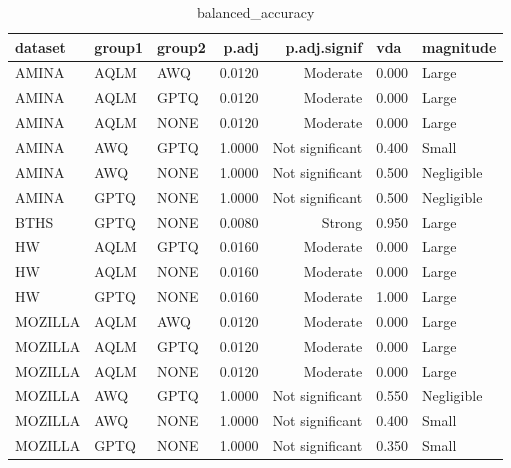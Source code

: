 \begin{table}
\caption{balanced_accuracy}
\begin{tabular}{lllrrll}
\toprule
dataset & group1 & group2 & p.adj & p.adj.signif & vda & magnitude \\
\midrule
AMINA & AQLM & AWQ & 0.0120 & Moderate & 0.000 & Large \\
AMINA & AQLM & GPTQ & 0.0120 & Moderate & 0.000 & Large \\
AMINA & AQLM & NONE & 0.0120 & Moderate & 0.000 & Large \\
AMINA & AWQ & GPTQ & 1.0000 & Not significant & 0.400 & Small \\
AMINA & AWQ & NONE & 1.0000 & Not significant & 0.500 & Negligible \\
AMINA & GPTQ & NONE & 1.0000 & Not significant & 0.500 & Negligible \\
BTHS & GPTQ & NONE & 0.0080 & Strong & 0.950 & Large \\
HW & AQLM & GPTQ & 0.0160 & Moderate & 0.000 & Large \\
HW & AQLM & NONE & 0.0160 & Moderate & 0.000 & Large \\
HW & GPTQ & NONE & 0.0160 & Moderate & 1.000 & Large \\
MOZILLA & AQLM & AWQ & 0.0120 & Moderate & 0.000 & Large \\
MOZILLA & AQLM & GPTQ & 0.0120 & Moderate & 0.000 & Large \\
MOZILLA & AQLM & NONE & 0.0120 & Moderate & 0.000 & Large \\
MOZILLA & AWQ & GPTQ & 1.0000 & Not significant & 0.550 & Negligible \\
MOZILLA & AWQ & NONE & 1.0000 & Not significant & 0.400 & Small \\
MOZILLA & GPTQ & NONE & 1.0000 & Not significant & 0.350 & Small \\
\bottomrule
\end{tabular}
\end{table}
